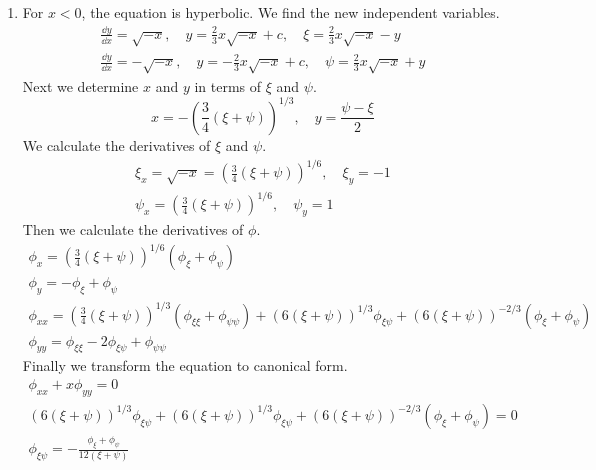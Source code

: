 {\begin{Solution}
\begin{enumerate}
    For $y = 0$ we have the ordinary differential equation
    \[
    \phi_{xx} + \phi_x -\phi + x^2 = 0.
    \]
    
    
  \item
    For $x < 0$, the equation is hyperbolic.  We find the new 
    independent variables.
    \begin{gather*}
      \frac{\dd y}{\dd x} = \sqrt{-x}, \quad
      y = \frac{2}{3} x \sqrt{-x} + c, \quad
      \xi = \frac{2}{3} x \sqrt{-x} - y 
      \\
      \frac{\dd y}{\dd x} = - \sqrt{-x}, \quad
      y = - \frac{2}{3} x \sqrt{-x} + c, \quad
      \psi = \frac{2}{3} x \sqrt{-x} + y
    \end{gather*}
    Next we determine $x$ and $y$ in terms of $\xi$ and $\psi$.
    \[
    x = - \left( \frac{3}{4} (\xi + \psi) \right)^{1/3}, \quad
    y = \frac{\psi - \xi}{2}
    \]
    We calculate the derivatives of $\xi$ and $\psi$.
    \begin{gather*}
      \xi_x = \sqrt{-x} = \left( \frac{3}{4} (\xi + \psi) \right)^{1/6}, \quad
      \xi_y = -1 
      \\
      \psi_x = \left( \frac{3}{4} (\xi + \psi) \right)^{1/6}, \quad
      \psi_y = 1
    \end{gather*}
    Then we calculate the derivatives of $\phi$.
    \begin{gather*}
      \phi_x = \left( \frac{3}{4} (\xi + \psi) \right)^{1/6} \left( \phi_\xi + \phi_\psi \right) 
      \\
      \phi_y = - \phi_\xi + \phi_\psi 
      \\
      \phi_{x x} = \left( \frac{3}{4} (\xi + \psi) \right)^{1/3}
      \left( \phi_{\xi \xi} + \phi_{\psi \psi} \right) + (6(\xi + \psi))^{1/3} \phi_{\xi \psi}
      + (6(\xi + \psi))^{-2/3} \left( \phi_\xi + \phi_\psi \right) 
      \\
      \phi_{y y} = \phi_{\xi \xi} - 2 \phi_{\xi \psi} + \phi_{\psi \psi}
    \end{gather*}
    Finally we transform the equation to canonical form.
    \begin{gather*}
      \phi_{x x} + x \phi_{y y} = 0 
      \\
      (6(\xi + \psi))^{1/3} \phi_{\xi \psi} + (6(\xi + \psi))^{1/3} \phi_{\xi \psi}
      + (6(\xi + \psi))^{-2/3} \left( \phi_\xi + \phi_\psi \right) = 0 
      \\
      \boxed{
        \phi_{\xi \psi} = - \frac{ \phi_\xi + \phi_\psi }{ 12 (\xi + \psi) }
        }
    \end{gather*}


\end{enumerate}
\end{Solution}}
